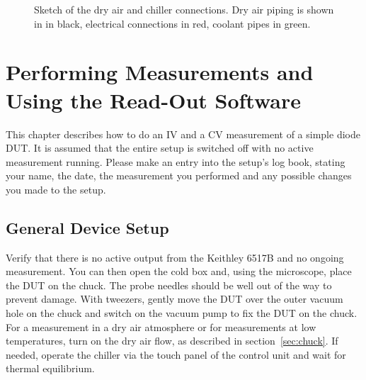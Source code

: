 \documentclass[a4paper]{article}
\begin{document}
\begin{figure}[hbtp]
\caption[Dry Air and Chiller Connections]{Sketch of the dry air and chiller connections. Dry air piping is shown in in black, electrical connections in red, coolant pipes in green.}
\label{fig:dryair}
\end{figure}

\afterpage{\null\newpage} %
\newpage

\section{Performing Measurements and Using the Read-Out Software}
\label{sec:meas}

This chapter describes how to do an IV and a CV measurement of a simple diode DUT.
It is assumed that the entire setup is switched off with no active measurement running.
Please make an entry into the setup's log book, stating your name, the date, the measurement you performed and any possible changes you made to the setup.\\

\subsection{General Device Setup}
\label{sec:devicesetup}

Verify that there is no active output from the Keithley 6517B and no ongoing measurement.
You can then open the cold box and, using the microscope, place the DUT on the chuck.
The probe needles should be well out of the way to prevent damage.
With tweezers, gently move the DUT over the outer vacuum hole on the chuck and switch on the vacuum pump to fix the DUT on the chuck.
For a measurement in a dry air atmosphere or for measurements at low temperatures, turn on the dry air flow, as described in section~\ref{sec:chuck}.
If needed, operate the chiller via the touch panel of the control unit and wait for thermal equilibrium.\\
\end{document}
